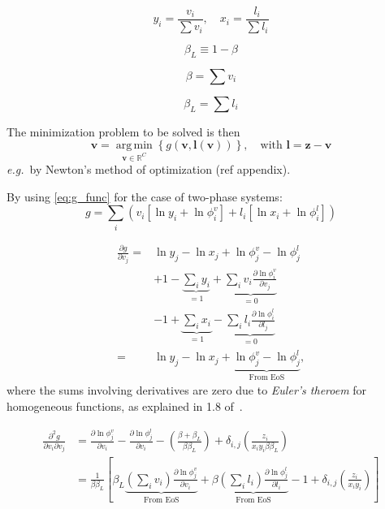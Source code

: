 \documentclass[internal,english]{sintefmemo2012}
\newcommand*{\vektor}[1]{\boldsymbol{#1}}%
\DeclareMathOperator*{\argmin}{arg\,min }
\begin{document}
\begin{equation}
  y_i = \frac{v_i}{\sum v_i}, \quad x_i = \frac{l_i}{\sum l_i}
  \label{}
\end{equation}

\begin{equation}
  \beta_L \equiv 1-\beta
  \label{}
\end{equation}

\begin{equation}
  \beta = \sum v_i
  \label{}
\end{equation}

\begin{equation}
  \beta_L = \sum l_i
  \label{}
\end{equation}

The minimization problem to be solved is then 
\begin{equation}
  \vektor{v} = \underset{\vektor{v} \in \mathbb{R}^C}{\argmin}\left\{g(\vektor{v},\vektor{l}(\vektor{v}))\right\}, \quad\text{with } 
  \vektor{l} = \vektor{z}-\vektor{v}
  \label{}
\end{equation}
\textit{e.g.}\ by Newton's method of optimization (ref appendix).


By using \eqref{eq:g_func} for the case of two-phase systems:
\begin{equation}
  g = \sum_i \left( v_i \left[ \ln y_i + \ln \phi_i^v \right] + l_i \left[ \ln x_i + \ln \phi_i^l \right] \right)
  \label{eq:g_twophase}
\end{equation}

\begin{align}
  \frac{\partial g}{\partial v_j}
  =& \ln y_j - \ln x_j + \ln \phi_j^v - \ln \phi_j^l \nonumber\\
  &+ 1 - \underbrace{\sum_i y_i}_{=1} + \underbrace{\sum_i v_i \frac{\partial \ln \phi_i^v}{\partial v_j}}_{=0}\nonumber\\
  &- 1 + \underbrace{\sum_i x_i}_{=1} - \underbrace{\sum_i l_i \frac{\partial \ln \phi_i^l}{\partial l_j}}_{=0} \nonumber\\
  =& \ln y_j - \ln x_j + \underbrace{\ln \phi_j^v - \ln \phi_j^l}_{\text{From EoS}},
  \label{}
\end{align}
where the sums involving derivatives are zero due to \textit{Euler's theroem} for homogeneous functions, as explained in
1.8 of~\cite{michelsen07}.

\begin{align}
  \frac{\partial^2 g}{\partial v_i \partial v_j} 
  &= \frac{\partial \ln \phi_j^v}{\partial v_i} - \frac{\partial \ln \phi_j^l}{\partial v_i}  
  - \left( \frac{\beta + \beta_L}{\beta \beta_L} \right)
  + \delta_{i,j} \left( \frac{z_i}{x_i y_i \beta \beta_L} \right) \nonumber\\
  &= 
  \frac{1}{\beta \beta_L} \left[
  \beta_L \underbrace{\left( \sum_i v_i\right)  \frac{\partial \ln \phi_j^v}{\partial v_i} }_\text{From EoS}
  +  \beta \underbrace{\left( \sum_i l_i\right)  \frac{\partial \ln \phi_j^l}{\partial l_i}}_\text{From EoS}
  - 1
  + \delta_{i,j} \left( \frac{z_i}{x_i y_i} \right) 
  \right]\nonumber\\
  \label{}
\end{align}
\end{document}
